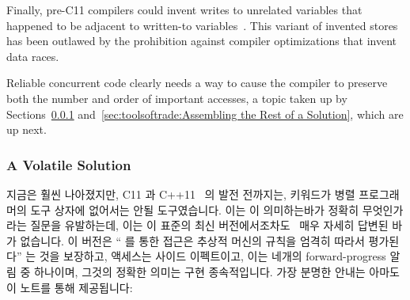 {{{{Finally, pre-C11 compilers could invent writes to unrelated
variables that happened to be adjacent to written-to
variables~\cite[Section 4.2]{Boehm:2005:TCI:1064978.1065042}.
This variant of invented stores has been outlawed by the prohibition
against compiler optimizations that invent data races.

Reliable concurrent code clearly needs a way to cause the compiler to
preserve both the number and order of important accesses, a topic taken
up by
Sections~\ref{sec:toolsoftrade:A Volatile Solution}
and~\ref{sec:toolsoftrade:Assembling the Rest of a Solution},
which are up next.
\fi

\subsubsection{A Volatile Solution}
\label{sec:toolsoftrade:A Volatile Solution}

지금은 훨씬 나아졌지만, C11 과 C++11~\cite{PeteBecker2011N3242} 의 발전
전까지는,  키워드가 병렬 프로그래머의 도구 상자에 없어서는 안될
도구였습니다.
이는  이 의미하는바가 정확히 무엇인가라는 질문을 유발하는데, 이는
이 표준의 최신 버전에서조차도~\cite{RichardSmith2018N4762} 매우 자세히 답변된
바가 없습니다.
이 버전은 ``  를 통한 접근은 추상적 머신의 규칙을
엄격히 따라서 평가된다'' 는 것을 보장하고,  액세스는 사이드
이펙트이고, 이는 네개의 forward-progress 알림 중 하나이며, 그것의 정확한 의미는
구현 종속적입니다.
가장 분명한 안내는 아마도 이 노트를 통해 제공됩니다:

}}}}

